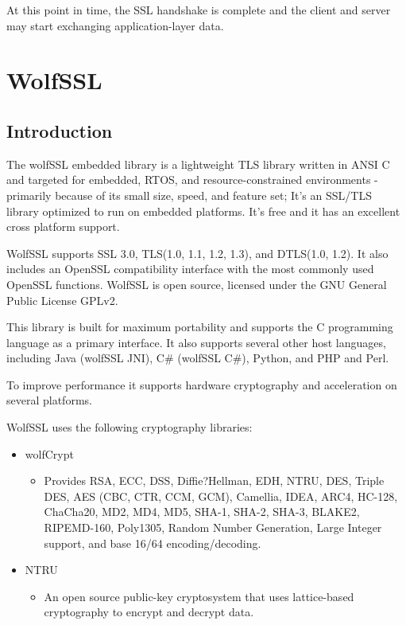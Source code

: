 \documentclass[a4paper,12pt]{article}
\begin{document}
\begin{itemize}
\begin{enumerate}
\end{enumerate}
\end{itemize}

At this point in time, the SSL handshake is complete and the client and server may start exchanging application-layer data.

\section{WolfSSL}
\subsection{Introduction}

The wolfSSL embedded library is a lightweight TLS library written in ANSI C and targeted for embedded, RTOS, and resource-constrained
environments - primarily because of its small size, speed, and feature set; It's an SSL/TLS library optimized to run on embedded platforms.
It's free and it has an excellent cross platform support.

WolfSSL supports SSL 3.0, TLS(1.0, 1.1, 1.2, 1.3), and DTLS(1.0, 1.2).
It also includes an OpenSSL compatibility interface with the most commonly used OpenSSL functions.
WolfSSL is open source, licensed under the GNU General Public License GPLv2.

This library is built for maximum portability and supports the C programming language as a primary interface. It also supports several other host languages, including Java (wolfSSL JNI), C\# (wolfSSL C\#), Python, and PHP and Perl.

To improve performance it supports hardware cryptography and acceleration on several platforms.

WolfSSL uses the following cryptography libraries:
\begin{itemize}
\item wolfCrypt
\begin{itemize}
\item Provides RSA, ECC, DSS, Diffie?Hellman, EDH, NTRU, DES, Triple DES, AES (CBC, CTR, CCM, GCM), Camellia, IDEA, ARC4, HC-128, ChaCha20, MD2, MD4, MD5, SHA-1, SHA-2, SHA-3, BLAKE2, RIPEMD-160, Poly1305, Random Number Generation, Large Integer support, and base 16/64 encoding/decoding.
\end{itemize}
\item NTRU
\begin{itemize}
\item An open source public-key cryptosystem that uses lattice-based cryptography to encrypt and decrypt data. 
\end{itemize}
\end{itemize}
\end{document}
